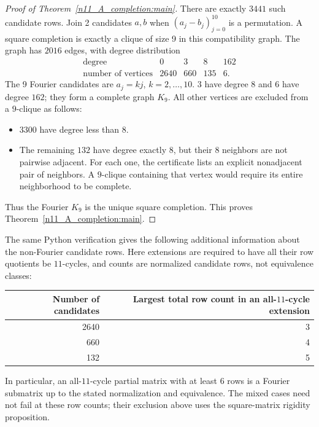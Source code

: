 \documentclass[11pt,a4paper]{article}
\theoremstyle{plain}
\theoremstyle{definition}
\theoremstyle{plain}
\begin{document}
\begin{proof}[Proof of Theorem~\ref{n11_A_completion:main}]
There are exactly $3441$ such candidate rows. Join 2 candidates $a,b$ when $(a_j-b_j)_{j=0}^{10}$ is a permutation. A square completion is exactly a clique of size 9 in this compatibility graph. The graph has $2016$ edges, with degree distribution
$$\begin{array}{c|rrrr}
\text{degree}&0&3&8&162\\\hline
\text{number of vertices}&2640&660&135&6.
\end{array}$$
The 9 Fourier candidates are $a_j=kj$, $k=2,\ldots,10$. 3 have degree 8 and 6 have degree $162$; they form a complete graph $K_9$. All other vertices are excluded from a $9$-clique as follows:
\par\noindent
\begin{minipage}{\linewidth}
\begin{itemize}
\item $3300$ have degree less than 8.
\item The remaining $132$ have degree exactly 8, but their 8 neighbors are not pairwise adjacent. For each one, the certificate lists an explicit nonadjacent pair of neighbors. A $9$-clique containing that vertex would require its entire neighborhood to be complete.
\end{itemize}
\end{minipage}\par
Thus the Fourier $K_9$ is the unique square completion. This proves Theorem~\ref{n11_A_completion:main}.
\end{proof}

The same Python verification gives the following additional information about the non-Fourier candidate rows. Here extensions are required to have all their row quotients be $11$-cycles, and counts are normalized candidate rows, not equivalence classes:
\begin{center}
\begin{tabular}{@{}rr@{}}
\toprule
Number of candidates & Largest total row count in an all-$11$-cycle extension\\
\midrule
2640 & 3\\
660 & 4\\
132 & 5\\
\bottomrule
\end{tabular}
\end{center}
In particular, an all-$11$-cycle partial matrix with at least 6 rows is a Fourier submatrix up to the stated normalization and equivalence. The mixed cases need not fail at these row counts; their exclusion above uses the square-matrix rigidity proposition.
\end{document}
